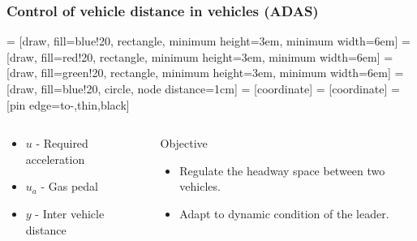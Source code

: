 \begin{frame}
    \frametitle{Control of vehicle distance in vehicles (ADAS)}
     = [draw, fill=blue!20, rectangle, minimum height=3em, minimum width=6em]
     = [draw, fill=red!20, rectangle, minimum height=3em, minimum width=6em]
     = [draw, fill=green!20, rectangle, minimum height=3em, minimum width=6em]
     = [draw, fill=blue!20, circle, node distance=1cm]
     = [coordinate]
     = [coordinate]
     = [pin edge={to-,thin,black}]
    \begin{center}
    \end{center}
    \begin{columns}
    \begin{column}{0.5\textwidth}
    \begin{itemize}
      \item $u$ - Required acceleration
      \item $u_a$ - Gas pedal 
      \item $y$ - Inter vehicle distance
    \end{itemize}
    \end{column}
    \begin{column}{0.5\textwidth}
      \begin{exampleblock}{Objective}
      \begin{itemize}
        \item Regulate the headway space between two vehicles.
        \item Adapt to dynamic condition of the leader.
    \end{itemize}
      \end{exampleblock}
    \end{column}
    \end{columns}
\end{frame}